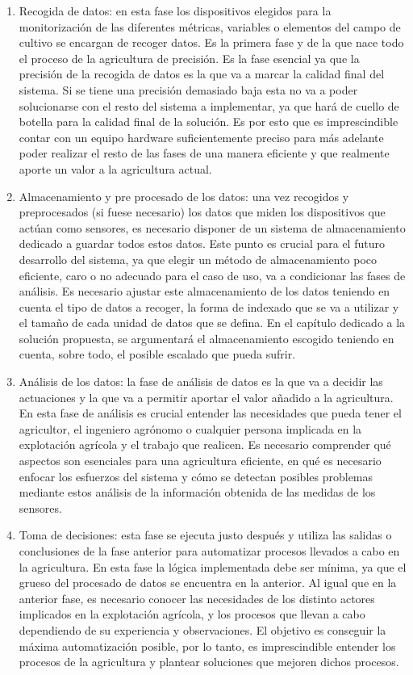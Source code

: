 \documentclass[../../memoria.tex]{subfiles}
\begin{document}
\begin{enumerate}
  \item Recogida de datos: en esta fase los dispositivos elegidos para la monitorización de las diferentes métricas, variables o elementos del campo de cultivo se encargan de recoger datos. Es la primera fase y de la que nace todo el proceso de la agricultura de precisión. Es la fase esencial ya que la precisión de la recogida de datos es la que va a marcar la calidad final del sistema. Si se tiene una precisión demasiado baja esta no va a poder solucionarse con el resto del sistema a implementar, ya que hará de cuello de botella para la calidad final de la solución. Es por esto que es imprescindible contar con un equipo hardware suficientemente preciso para más adelante poder realizar el resto de las fases de una manera eficiente y que realmente aporte un valor a la agricultura actual.

  \item Almacenamiento y pre procesado de los datos: una vez recogidos y preprocesados (si fuese necesario) los datos que miden los dispositivos que actúan como sensores, es necesario disponer de un sistema de almacenamiento dedicado a guardar todos estos datos. Este punto es crucial para el futuro desarrollo del sistema, ya que elegir un método de almacenamiento poco eficiente, caro o no adecuado para el caso de uso, va a condicionar las fases de análisis. Es necesario ajustar este almacenamiento de los datos teniendo en cuenta el tipo de datos a recoger, la forma de indexado que se va a utilizar y el tamaño de cada unidad de datos que se defina. En el capítulo dedicado a la solución propuesta, se argumentará el almacenamiento escogido teniendo en cuenta, sobre todo, el posible escalado que pueda sufrir.

  \item  Análisis de los datos: la fase de análisis de datos es la que va a decidir las actuaciones y la que va a permitir aportar el valor añadido a la agricultura. En esta fase de análisis es crucial entender las necesidades que pueda tener el agricultor, el ingeniero agrónomo o cualquier persona implicada en la explotación agrícola y el trabajo que realicen. Es necesario comprender qué aspectos son esenciales para una agricultura eficiente, en qué es necesario enfocar los esfuerzos del sistema y cómo se detectan posibles problemas mediante estos análisis de la información obtenida de las medidas de los sensores.

  \item  Toma de decisiones: esta fase se ejecuta justo después y utiliza las salidas o conclusiones de la fase anterior para automatizar procesos llevados a cabo en la agricultura. En esta fase la lógica implementada debe ser mínima, ya que el grueso del procesado de datos se encuentra en la anterior. Al igual que en la anterior fase, es necesario conocer las necesidades de los distinto actores implicados en la explotación agrícola, y los procesos que llevan a cabo dependiendo de su experiencia y observaciones. El objetivo es conseguir la máxima automatización posible, por lo tanto, es imprescindible entender los procesos de la agricultura y plantear soluciones que mejoren dichos procesos.


\end{enumerate}
\end{document}
